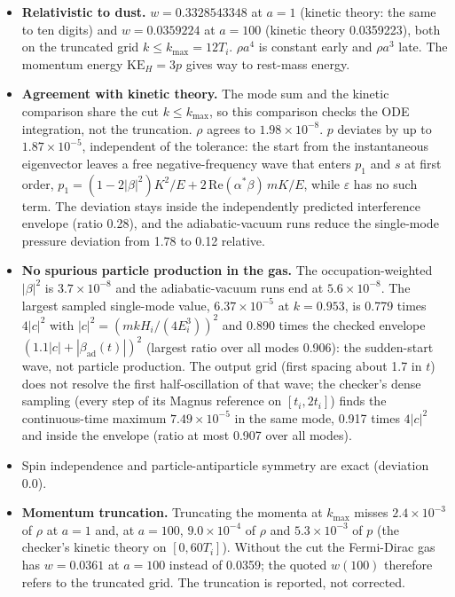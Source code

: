 \documentclass[11pt]{article}
\begin{document}
\begin{itemize}
\item \textbf{Relativistic to dust.} $w=0.3328543348$ at $a=1$ (kinetic theory: the same to ten digits) and $w=0.0359224$ at $a=100$ (kinetic theory 0.0359223), both on the truncated grid $k\le k_{\max}=12T_i$. $\rho a^4$ is constant early and $\rho a^3$ late. The momentum energy $\mathrm{KE}_H=3p$ gives way to rest-mass energy.
\item \textbf{Agreement with kinetic theory.} The mode sum and the kinetic comparison share the cut $k\le k_{\max}$, so this comparison checks the ODE integration, not the truncation. $\rho$ agrees to $1.98\times10^{-8}$. $p$ deviates by up to $1.87\times10^{-5}$, independent of the tolerance: the start from the instantaneous eigenvector leaves a free negative-frequency wave that enters $p_1$ and $s$ at first order, $p_1=(1-2|\beta|^2)K^2/E+2\,\mathrm{Re}(\alpha^\ast\beta)\,mK/E$, while $\varepsilon$ has no such term. The deviation stays inside the independently predicted interference envelope (ratio 0.28), and the adiabatic-vacuum runs reduce the single-mode pressure deviation from 1.78 to 0.12 relative.
\item \textbf{No spurious particle production in the gas.} The occupation-weighted $|\beta|^2$ is $3.7\times10^{-8}$ and the adiabatic-vacuum runs end at $5.6\times10^{-8}$. The largest sampled single-mode value, $6.37\times10^{-5}$ at $k=0.953$, is 0.779 times $4|c|^2$ with $|c|^2=(mkH_i/(4E_i^3))^2$ and 0.890 times the checked envelope $(1.1|c|+|\beta_{\mathrm{ad}}(t)|)^2$ (largest ratio over all modes 0.906): the sudden-start wave, not particle production. The output grid (first spacing about 1.7 in $t$) does not resolve the first half-oscillation of that wave; the checker's dense sampling (every step of its Magnus reference on $[t_i,2t_i]$) finds the continuous-time maximum $7.49\times10^{-5}$ in the same mode, 0.917 times $4|c|^2$ and inside the envelope (ratio at most 0.907 over all modes).
\item Spin independence and particle-antiparticle symmetry are exact (deviation 0.0).
\item \textbf{Momentum truncation.} Truncating the momenta at $k_{\max}$ misses $2.4\times10^{-3}$ of $\rho$ at $a=1$ and, at $a=100$, $9.0\times10^{-4}$ of $\rho$ and $5.3\times10^{-3}$ of $p$ (the checker's kinetic theory on $[0,60T_i]$). Without the cut the Fermi-Dirac gas has $w=0.0361$ at $a=100$ instead of 0.0359; the quoted $w(100)$ therefore refers to the truncated grid. The truncation is reported, not corrected.
\end{itemize}
\end{document}
